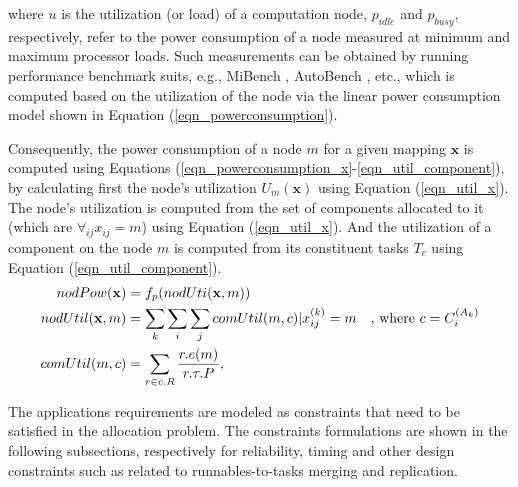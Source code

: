 where $u$ is the utilization (or load) of a computation node, $p_{idle}$ and $p_{busy}$, respectively, refer to the power consumption of a node measured at minimum and maximum processor loads. Such measurements can be obtained by running performance benchmark suits, e.g., MiBench \cite{Guthaus2001MiBench:Suite}, AutoBench \cite{EMBC2018AutoBenchProcessors}, etc., which is computed based on the utilization of the node via the linear power consumption model shown in Equation (\ref{eqn_powerconsumption}).

Consequently, the power consumption of a node $m$ for a given mapping $\textbf{x}$ is computed using Equations (\ref{eqn_powerconsumption_x}-\ref{eqn_util_component}), by calculating first the node's utilization $U_m(\textbf{x})$ using Equation (\ref{eqn_util_x}). The node's utilization is computed from the set of components allocated to it (which are $\forall_{ij} x_{ij}=m$) using Equation (\ref{eqn_util_x}). And the utilization of a component on the node $m$ is computed from its constituent tasks $T_c$ using Equation (\ref{eqn_util_component}).
\begin{align}
	\label{eqn_powerconsumption_x}
nodPow(\textbf{x}) & =f_p(nodUti(\textbf{x},m))                         &  \\
	\label{eqn_util_x}
nodUtil(\textbf{x},m)           & = \sum_{k}{\sum_{i}{\sum_{j}{comUtil(m,c)}}}|\xkij=m         & \text{, where } c=\ttsss{C}\\
	\label{eqn_util_component}
comUtil(m,c)              & = \sum_{r\in c.R} \frac{r.e(m)}{r.\tau.P}, &
\end{align}

The applications requirements are modeled as constraints that need to be satisfied in the allocation problem. The constraints formulations are shown in the following subsections, respectively for reliability, timing and other design constraints such as related to runnables-to-tasks merging and replication.



